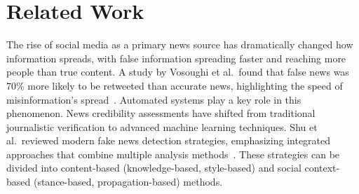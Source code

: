 \documentclass[runningheads]{llncs}
\begin{document}

\section{Related Work}



The rise of social media as a primary news source has dramatically changed how information spreads, with false information spreading faster and reaching more people than true content. A study by Vosoughi et al.~found that false news was 70\% more likely to be retweeted than accurate news, highlighting the speed of misinformation's spread~\cite{vosoughi2018spread}. Automated systems play a key role in this phenomenon.
News credibility assessments have shifted from traditional journalistic verification to advanced machine learning techniques. Shu et al.~reviewed modern fake news detection strategies, emphasizing integrated approaches that combine multiple analysis methods~\cite{shu2017fakenews}. These strategies can be divided into content-based (knowledge-based, style-based) and social context-based (stance-based, propagation-based) methods.
\end{document}
